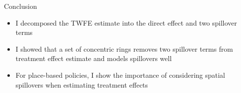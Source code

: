 \documentclass[aspectratio=169]{beamer}
\begin{document}
\begin{frame}{Conclusion}
    \begin{itemize}
        \item I decomposed the TWFE estimate into the direct effect and two spillover terms
        
        \item I showed that a set of concentric rings removes two spillover terms from treatment effect estimate and models spillovers well
        
        \item For place-based policies, I show the importance of considering spatial spillovers when estimating treatment effects
    \end{itemize}
\end{frame}
\end{document}
